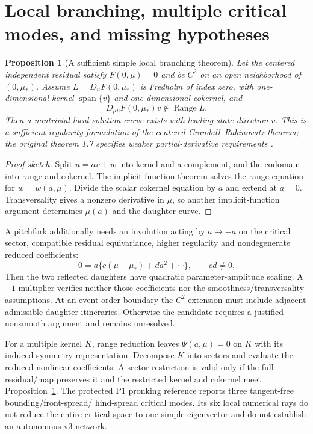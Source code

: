 \documentclass[11pt]{article}
\newtheorem{proposition}{Proposition}
\newcommand{\Range}{\operatorname{Range}}
\begin{document}
\section{Local branching, multiple critical modes, and missing hypotheses}
\begin{proposition}[A sufficient simple local branching theorem]\label{prop:cr}
Let the centered independent residual satisfy $F(0,\mu)=0$ and be $C^2$
on an open neighborhood of $(0,\mu_*)$. Assume
$L=D_uF(0,\mu_*)$ is Fredholm of index zero, with one-dimensional kernel
$\operatorname{span}\{v\}$ and one-dimensional cokernel, and
\[
D_{\mu u}F(0,\mu_*)v\notin\Range L.
\]
Then a nontrivial local solution curve exists with leading state direction
$v$. This is a sufficient regularity formulation of the centered
Crandall--Rabinowitz theorem; the original theorem 1.7 specifies weaker
partial-derivative requirements \cite{cr}.
\end{proposition}
\begin{proof}[Proof sketch]
Split $u=av+w$ into kernel and a complement, and the codomain into range
and cokernel. The implicit-function theorem solves the range equation for
$w=w(a,\mu)$. Divide the scalar cokernel equation by $a$ and extend at
$a=0$. Transversality gives a nonzero derivative in $\mu$, so another
implicit-function argument determines $\mu(a)$ and the daughter curve.
\end{proof}
A pitchfork additionally needs an involution acting by $a\mapsto-a$ on the
critical sector, compatible residual equivariance, higher regularity and
nondegenerate reduced coefficients:
\[
0=a\{c(\mu-\mu_*)+d a^2+\cdots\},\qquad cd\ne0.
\]
Then the two reflected daughters have quadratic parameter-amplitude
scaling. A $+1$ multiplier verifies neither those coefficients nor the
smoothness/transversality assumptions. At an event-order boundary the $C^2$
extension must include adjacent admissible daughter itineraries. Otherwise
the candidate requires a justified nonsmooth argument and remains unresolved.

For a multiple kernel $K$, range reduction leaves
$\Psi(a,\mu)=0$ on $K$ with its induced symmetry representation. Decompose
$K$ into sectors and evaluate the reduced nonlinear coefficients. A sector
restriction is valid only if the full residual/map preserves it and the
restricted kernel and cokernel meet Proposition~\ref{prop:cr}. The protected
P1 pronking reference reports three tangent-free bounding/front-spread/
hind-spread critical modes. Its six local numerical rays do not reduce the
entire critical space to one simple eigenvector and do not establish an
autonomous v3 network.
\end{document}
